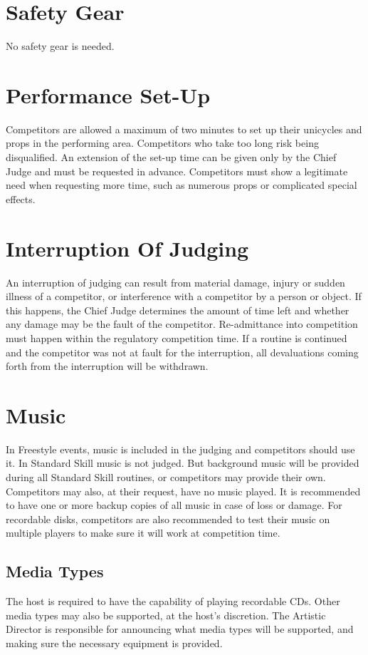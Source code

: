 \section{Safety Gear}
No safety gear is needed.

\section{Performance Set-Up}
Competitors are allowed a maximum of two minutes to set up their unicycles and props in the performing area.
Competitors who take too long risk being disqualified.
An extension of the set-up time can be given only by the Chief Judge and must be requested in advance.
Competitors must show a legitimate need when requesting more time, such as numerous props or complicated special effects.

\section{Interruption Of Judging}
An interruption of judging can result from material damage, injury or sudden illness of a competitor, or interference with a competitor by a person or object.
If this happens, the Chief Judge determines the amount of time left and whether any damage may be the fault of the competitor.
Re-admittance into competition must happen within the regulatory competition time.
If a routine is continued and the competitor was not at fault for the interruption, all devaluations coming forth from the interruption will be withdrawn.

\section{Music \label{sec:freestyle_music}}
In Freestyle events, music is included in the judging and competitors should use it.
In Standard Skill music is not judged.
But background music will be provided during all Standard Skill routines, or competitors may provide their own.
Competitors may also, at their request, have no music played.
It is recommended to have one or more backup copies of all music in case of loss or damage.
For recordable disks, competitors are also recommended to test their music on multiple players to make sure it will work at competition time.

\subsection{Media Types}
The host is required to have the capability of playing recordable CDs.
Other media types may also be supported, at the host's discretion.
The Artistic Director is responsible for announcing what media types will be supported, and making sure the necessary equipment is provided.

